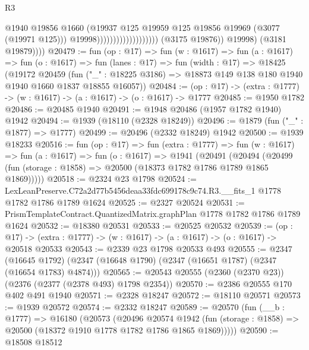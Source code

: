 \begin{lexlean}{R3}
\begin{coremodule}
                                                    @1940
                                                    @19856
                                                    @1660
                                                    (@19937
                                                      @125
                                                      @19959
                                                      @125
                                                      @19856
                                                      @19969
                                                      (@3077 (@19971 @125)))
                                                    @19998)))))))))))))))))))
              (@3175 @19876))
            @19998)
          (@3181 @19879))))
@20479 := fun (op : @17) =>
  fun (w : @1617) =>
  fun (a : @1617) =>
  fun (o : @1617) =>
  fun (lanes : @17) =>
  fun (width : @17) =>
  @18425
    (@19172
      @20459
      (fun ("_" : @18225 @3186) => @18873 @149 @138 @180 @1940 @1940 @1660 @1837 @18855 @16057))
@20484 := (op : @17) -> (extra : @1777) -> (w : @1617) -> (a : @1617) -> (o : @1617) -> @1777
@20485 := @1950 @1782
@20486 := @20485 @1940
@20491 := @1948 @20486 (@1957 @1782 @1940) @1942
@20494 := @1939 (@18110 (@2328 @18249))
@20496 := @1879 (fun ("_" : @1877) => @1777)
@20499 := @20496 (@2332 @18249) @1942
@20500 := @1939 @18233
@20516 := fun (op : @17) =>
  fun (extra : @1777) =>
  fun (w : @1617) =>
  fun (a : @1617) =>
  fun (o : @1617) =>
  @1941
    (@20491
      (@20494 (@20499 (fun (storage : @1858) => @20500 (@18373 @1782 @1786 @1789 @1865 @1869)))))
@20518 := @2324 @23 @1798
@20524 := LexLeanPreserve.C72a2d77b5456deaa33fdc699178c9c74.R3.__fits_1
    @1778
    @1782
    @1786
    @1789
    @1624
@20525 := @2327 @20524
@20531 := PrismTemplateContract.QuantizedMatrix.graphPlan @1778 @1782 @1786 @1789 @1624
@20532 := @18380 @20531
@20533 := @20525 @20532
@20539 := (op : @17) ->
  (extra : @1777) -> (w : @1617) -> (a : @1617) -> (o : @1617) -> @20518 @20533
@20543 := @2339 @23 @1798 @20533 @493
@20555 := @2347
    (@16645 @1792)
    (@2347 (@16648 @1790) (@2347 (@16651 @1787) (@2347 (@16654 @1783) @4874)))
@20565 := @20543 @20555 (@2360 (@2370 @23)) (@2376 (@2377 (@2378 @493) @1798 @2354))
@20570 := @2386 @20555 @170 @402 @491 @1940
@20571 := @2328 @18247
@20572 := @18110 @20571
@20573 := @1939 @20572
@20574 := @2332 @18247
@20589 := @20570
    (fun (__b : @1777) =>
    @16180
      (@20573
        (@20496
          @20574
          @1942
          (fun (storage : @1858) => @20500 (@18372 @1910 @1778 @1782 @1786 @1865 @1869)))))
@20590 := @18508 @18512

\end{coremodule}
\end{lexlean}
